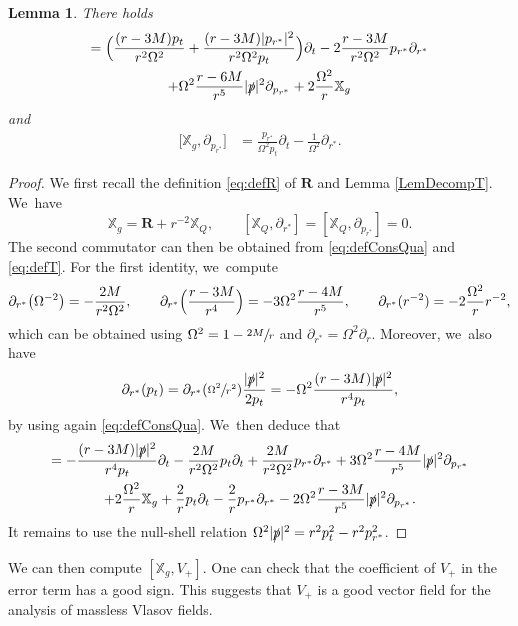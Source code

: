 \documentclass[JEP,XML,SOM,Unicode,published]{cedram}
\theoremstyle{plain}
\newtheorem{lemma}[proposition]{Lemma}
\theoremstyle{definition}
\newcommand\T{{\mathbb{X}}}
\begin{document}
\begin{lemma}\label{LemComdrdpr}
There holds
\begin{multline*}
[\T_g,\partial_{r^*}] = \Bigl(\frac{(r-3M)p_t}{r^2 \Omega^2}+\frac{(r-3M)|p_{r^*}|^2}{r^2 \Omega^2 p_t} \Bigr) \partial_t-2\frac{r-3M}{r^2 \Omega^2}p_{r^*} \partial_{r^*} \\
+ \Omega^2 \frac{r-6M}{r^5} |\slashed{p}|^2 \partial_{p_{r^*}}+2\frac{\Omega^2}{r}\T_g
\end{multline*}
and
\begin{align*}
\bigl[ \T_g, \partial_{p_{r^*}} \bigr] & = \frac{p_{r^*}}{ \Omega^2p_t} \partial_t- \frac{1}{\Omega^2} \partial_{r^*}.
\end{align*}
\end{lemma}

\begin{proof}
We first recall the definition \eqref{eq:defR} of $\pmb{R}$ and Lemma \ref{LemDecompT}. We~have
\[
\T_g = \pmb{R}+r^{-2} \T_Q,\qquad [\T_Q, \partial_{r^*}]=[\T_Q, \partial_{p_{r^*}}]=0.
\]
The second commutator can then be obtained from \eqref{eq:defConsQua} and \eqref{eq:defT}. For the first identity, we~compute
\[
\partial_{r^*} \bigl(\Omega^{-2} \bigr) = - \frac{2M}{r^2 \Omega^2}, \qquad \partial_{r^*} \Bigl(\frac{r-3M}{r^4} \Bigr) = -3 \Omega^2 \frac{r-4M}{r^5}, \qquad \partial_{r^*}(r^{-2})= -2 \frac{\Omega^2}{r}r^{-2},
\]
which can be obtained using $\Omega^2=1-\sfrac{2M}{r}$ and $\partial_{r^*} = \Omega^2 \partial_r$. Moreover, we~also have
\begin{equation}\label{preuvecompartialr}
\partial_{r^*} (p_t)= \partial_{r^*}(\sfrac{\Omega^2}{r^2}) \frac{|\slashed{p}|^2}{2p_t}= - \Omega^2 \frac{(r-3M)|\slashed{p}|^2}{r^4p_t},
\end{equation}
by using again \eqref{eq:defConsQua}. We~then deduce that
\begin{multline*}
[\T_g,\partial_{r^*}] = -\frac{(r-3M)|\slashed{p}|^2}{r^4p_t} \partial_t - \frac{2M}{r^2 \Omega^2}p_t \partial_t+ \frac{2M}{r^2 \Omega^2} p_{r^*} \partial_{r^*} +3 \Omega^2 \frac{r-4M}{r^5} |\slashed{p}|^2 \partial_{p_{r^*}} \\
+2\frac{\Omega^2}{r}\T_g+\frac{2}{r} p_t \partial_t-\frac{2}{r}p_{r^*} \partial_{r^*} -2\Omega^2 \frac{r-3M}{r^5}|\slashed{p}|^2 \partial_{p_{r^*}}.
\end{multline*}
It remains to use the null-shell relation $\Omega^2|\slashed{p}|^2=r^2p_t^2-r^2p_{r^*}^2$.
\end{proof}

We can then compute $[\T_g,V_+]$. One can check that the coefficient of $V_+$ in the error term has a good sign. This suggests that $V_+$ is a good vector field for the analysis of massless Vlasov fields.
\end{document}
